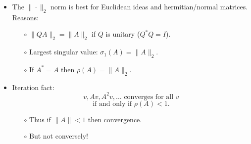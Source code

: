 \documentclass{amsart}
\newcommand{\alert}[1]{{\color{red} #1}}
\begin{document}
\begin{itemize}
\begin{itemize}
  \end{itemize}
\item The $\|\cdot\|_2$ norm is best for \alert{Euclidean ideas} and \alert{hermitian/normal matrices}.  Reasons: 
  \begin{itemize}
  \item[$\circ$]  $\|QA\|_2 = \|A\|_2$ if $Q$ is unitary ($Q^* Q = I$).
  \item[$\circ$]  Largest singular value: $\sigma_1(A) = \|A\|_2$.
  \item[$\circ$]  If $A^*=A$ then $\rho(A)=\|A\|_2$.
  \end{itemize}
\item \alert{Iteration} fact:
    $$v, Av, A^2v, \dots \text{ converges for all $v$}$$
    $$\text{if and only if } \rho(A)<1.$$
  \begin{itemize}
  \item[$\circ$] Thus \alert{if} $\|A\|<1$ \alert{then} convergence.
  \item[$\circ$] But not conversely!
  \end{itemize}
\end{itemize}
\end{document}
